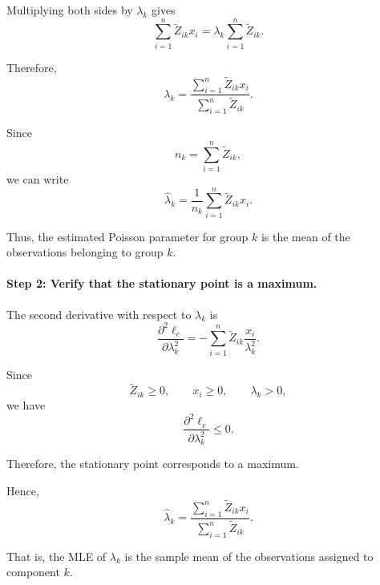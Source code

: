 Multiplying both sides by $\lambda_k$ gives
\[
\sum_{i=1}^n \tilde{Z}_{ik}x_i
=
\lambda_k
\sum_{i=1}^n \tilde{Z}_{ik}.
\]

Therefore,
\[
\lambda_k
=
\frac{\sum_{i=1}^n \tilde{Z}_{ik}x_i}
{\sum_{i=1}^n \tilde{Z}_{ik}}.
\]

Since
\[
n_k=\sum_{i=1}^n\tilde{Z}_{ik},
\]
we can write
\[
\boxed{
\hat{\lambda}_k
=
\frac{1}{n_k}
\sum_{i=1}^n\tilde{Z}_{ik}x_i
}.
\]

Thus, the estimated Poisson parameter for group $k$ is the
mean of the observations belonging to group $k$.

\paragraph{Step 2: Verify that the stationary point is a maximum.}

The second derivative with respect to $\lambda_k$ is
\[
\frac{\partial^2\ell_c}{\partial\lambda_k^2}
=
-\sum_{i=1}^n
\tilde{Z}_{ik}
\frac{x_i}{\lambda_k^2}.
\]

Since
\[
\tilde{Z}_{ik}\geq 0,
\qquad
x_i\geq 0,
\qquad
\lambda_k>0,
\]
we have
\[
\frac{\partial^2\ell_c}{\partial\lambda_k^2}
\leq 0.
\]

Therefore, the stationary point corresponds to a maximum.

Hence,
\[
\boxed{
\hat{\lambda}_k
=
\frac{\sum_{i=1}^n\tilde{Z}_{ik}x_i}
{\sum_{i=1}^n\tilde{Z}_{ik}}
}.
\]

That is, the MLE of $\lambda_k$ is the sample mean of the
observations assigned to component $k$.
